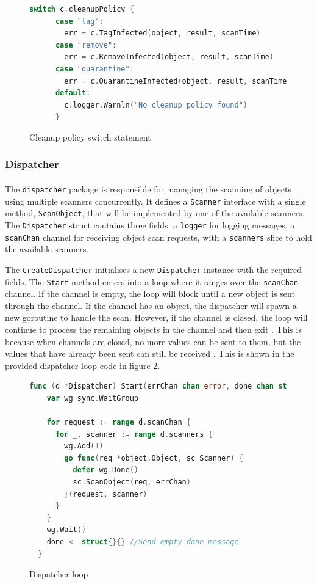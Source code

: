 \documentclass[12pt, conference, final, a4paper, onecolumn, compsoc]{IEEEtran}
\begin{document}
\begin{figure}[H]
\begin{lstlisting}[language=Go]
      switch c.cleanupPolicy {
      case "tag":
        err = c.TagInfected(object, result, scanTime)
      case "remove":
        err = c.RemoveInfected(object, result, scanTime)
      case "quarantine":
        err = c.QuarantineInfected(object, result, scanTime)
      default:
        c.logger.Warnln("No cleanup policy found")
      }
\end{lstlisting}
  \caption{Cleanup policy switch statement}
  \label{fig:cleaner-switch}
\end{figure}

\subsubsection*{Dispatcher}
\paragraph{}

The \texttt{dispatcher} package is responsible for managing the scanning of
objects using multiple scanners concurrently. It defines a \texttt{Scanner}
interface with a single method, \texttt{ScanObject}, that will be implemented by
one of the available scanners. The \texttt{Dispatcher} struct contains three
fields: a \texttt{logger} for logging messages, a \texttt{scanChan} channel for
receiving object scan requests, with a \texttt{scanners} slice to hold the
available scanners.

The \texttt{CreateDispatcher} initialises a new \texttt{Dispatcher} instance
with the required fields. The \texttt{Start} method enters into a loop where it
ranges over the \texttt{scanChan} channel. If the channel is empty, the loop
will block until a new object is sent through the channel. If the channel has an
object, the dispatcher will spawn a new goroutine to handle the scan. However,
if the channel is closed, the loop will continue to process the remaining
objects in the channel and then exit \citep{go-channel-ranges}. This is because
when channels are closed, no more values can be sent to them, but the values
that have already been sent can still be received \citep{go-closing-channels}.
This is shown in the provided dispatcher loop code in figure
\ref{fig:dispatcher-loop}.

\begin{figure}[H]
\begin{lstlisting}[language=Go]
  func (d *Dispatcher) Start(errChan chan error, done chan struct{}) {
    var wg sync.WaitGroup

    for request := range d.scanChan {
      for _, scanner := range d.scanners {
        wg.Add(1)
        go func(req *object.Object, sc Scanner) {
          defer wg.Done()
          sc.ScanObject(req, errChan)
        }(request, scanner)
      }
    }
    wg.Wait()
    done <- struct{}{} //Send empty done message
  }
\end{lstlisting}
  \caption{Dispatcher loop}
  \label{fig:dispatcher-loop}
\end{figure}
\end{document}

